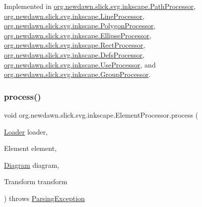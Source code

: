 Implemented in \mbox{\hyperlink{classorg_1_1newdawn_1_1slick_1_1svg_1_1inkscape_1_1_path_processor_a0dda8e99a9e32cfa07593e50537be812}{org.\+newdawn.\+slick.\+svg.\+inkscape.\+Path\+Processor}}, \mbox{\hyperlink{classorg_1_1newdawn_1_1slick_1_1svg_1_1inkscape_1_1_line_processor_ae2f55b553c23eb5a3bab9d194ce2b4bb}{org.\+newdawn.\+slick.\+svg.\+inkscape.\+Line\+Processor}}, \mbox{\hyperlink{classorg_1_1newdawn_1_1slick_1_1svg_1_1inkscape_1_1_polygon_processor_ae16fc3ea9284d46c0db316bfeeca56f5}{org.\+newdawn.\+slick.\+svg.\+inkscape.\+Polygon\+Processor}}, \mbox{\hyperlink{classorg_1_1newdawn_1_1slick_1_1svg_1_1inkscape_1_1_ellipse_processor_a54a6dbcfc6d01e3fd2bc61aeed789c88}{org.\+newdawn.\+slick.\+svg.\+inkscape.\+Ellipse\+Processor}}, \mbox{\hyperlink{classorg_1_1newdawn_1_1slick_1_1svg_1_1inkscape_1_1_rect_processor_a8558ba7a28daef670cedb8afe8d68286}{org.\+newdawn.\+slick.\+svg.\+inkscape.\+Rect\+Processor}}, \mbox{\hyperlink{classorg_1_1newdawn_1_1slick_1_1svg_1_1inkscape_1_1_defs_processor_a648d4dd3a482f1a7f329a7b1ae27e387}{org.\+newdawn.\+slick.\+svg.\+inkscape.\+Defs\+Processor}}, \mbox{\hyperlink{classorg_1_1newdawn_1_1slick_1_1svg_1_1inkscape_1_1_use_processor_a708b3d8ee6187b45b27913116c689e43}{org.\+newdawn.\+slick.\+svg.\+inkscape.\+Use\+Processor}}, and \mbox{\hyperlink{classorg_1_1newdawn_1_1slick_1_1svg_1_1inkscape_1_1_group_processor_a870dccc7ed743d7d2456575009813c75}{org.\+newdawn.\+slick.\+svg.\+inkscape.\+Group\+Processor}}.

\mbox{\label{interfaceorg_1_1newdawn_1_1slick_1_1svg_1_1inkscape_1_1_element_processor_acd170a9e1119481edae885780db59a2e}} 
\subsubsection{\texorpdfstring{process()}{process()}}
{\footnotesize\ttfamily void org.\+newdawn.\+slick.\+svg.\+inkscape.\+Element\+Processor.\+process (\begin{DoxyParamCaption}\item[{\mbox{\hyperlink{interfaceorg_1_1newdawn_1_1slick_1_1svg_1_1_loader}{Loader}}}]{loader,  }\item[{Element}]{element,  }\item[{\mbox{\hyperlink{classorg_1_1newdawn_1_1slick_1_1svg_1_1_diagram}{Diagram}}}]{diagram,  }\item[{Transform}]{transform }\end{DoxyParamCaption}) throws \mbox{\hyperlink{classorg_1_1newdawn_1_1slick_1_1svg_1_1_parsing_exception}{Parsing\+Exception}}}

